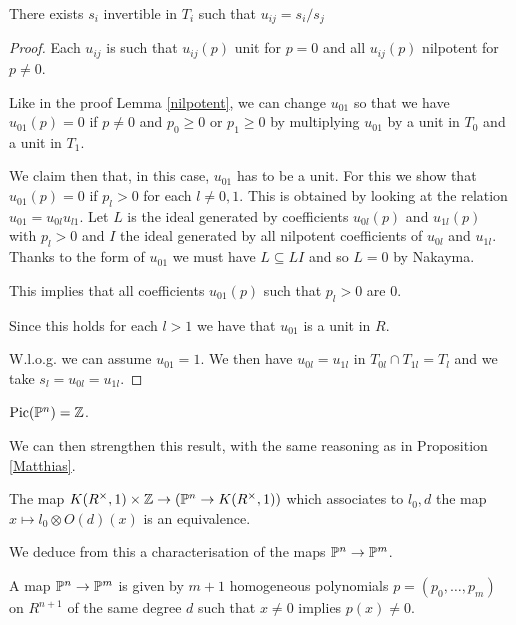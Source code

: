 \begin{proposition}
  There exists $s_i$ invertible in $T_i$ such that $u_{ij} = s_i/s_j$ 
\end{proposition}

\begin{proof}
  Each $u_{ij}$ is such that $u_{ij}(p)$ unit for $p=0$ and
  all $u_{ij}(p)$ nilpotent for $p\neq 0$.

  Like in the proof Lemma \ref{nilpotent}, we can change $u_{01}$ so that
  we have $u_{01}(p) = 0$ if $p\neq 0$ and $p_0\geqslant 0$ or $p_1\geqslant 0$ by multiplying $u_{01}$ by a unit in $T_0$ and a unit in $T_1$.
  
  We claim then that, in this case, $u_{01}$ has to be a unit. For this we show that $u_{01}(p) = 0$
  if $p_l>0$ for each $l\neq 0,1$.
  This is obtained by looking at the relation $u_{01}= u_{0l}u_{l1}$. Let $L$ is the ideal generated by
  coefficients $u_{0l}(p)$ and $u_{1l}(p)$ with $p_l>0$ and $I$
  the ideal generated by all nilpotent coefficients of $u_{0l}$ and $u_{1l}$.
  Thanks to the form of $u_{01}$ we must have $L\subseteq LI$ and so $L=0$ by Nakayma.

  This implies that all coefficients $u_{01}(p)$ such that $p_l>0$ are $0$.

  Since this holds for each $l>1$ we have that $u_{01}$ is a unit in $R$.

  W.l.o.g. we can assume $u_{01}= 1$. We then have $u_{0l} = u_{1l}$ in $T_{0l}\cap T_{1l} = T_l$
  and we take $s_l = u_{0l} = u_{1l}$.
\end{proof}

\begin{corollary}
  $\mathrm{Pic}(\mathbb{P}^n) = \mathbb{Z}$.
\end{corollary}

We can then strengthen this result, with the same reasoning as in Proposition \ref{Matthias}.

\begin{theorem}\label{Matthias2}
  The map $K(R^{\times},1)\times\mathbb{Z}\rightarrow (\mathbb{P}^n\rightarrow K(R^{\times},1))$
  which associates to $l_0,d$ the map $x\mapsto l_0\otimes O(d)(x)$ is an equivalence.
\end{theorem}

We deduce from this a characterisation of the maps $\mathbb{P}^n\rightarrow\mathbb{P}^m$.%

\begin{corollary}\label{map}
  A map $\mathbb{P}^n\rightarrow\mathbb{P}^m$ is given by $m+1$ homogeneous polynomials $p = (p_0,\dots,p_m)$ on $R^{n+1}$
  of the same   degree $d$ such that $x\neq 0$ implies $p(x)\neq 0$.
\end{corollary}

